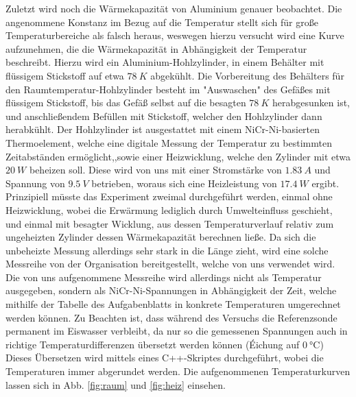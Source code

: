 \documentclass{include/protokollclass}
\begin{document}
Zuletzt wird noch die Wärmekapazität von Aluminium genauer beobachtet. Die angenommene Konstanz im Bezug auf die Temperatur stellt sich für große Temperaturbereiche als falsch heraus, weswegen hierzu versucht wird eine Kurve aufzunehmen, die die Wärmekapazität in Abhängigkeit der Temperatur beschreibt. Hierzu wird ein Aluminium-Hohlzylinder, in einem Behälter mit flüssigem Stickstoff auf etwa $\SI{78}{K}$ abgekühlt. Die Vorbereitung des Behälters für den Raumtemperatur-Hohlzylinder besteht im "Auswaschen" des Gefäßes mit flüssigem Stickstoff, bis das Gefäß selbst auf die besagten $\SI{78}{K}$ herabgesunken ist, und anschließendem Befüllen mit Stickstoff, welcher den Hohlzylinder dann herabkühlt. Der Hohlzylinder ist ausgestattet mit einem NiCr-Ni-basierten Thermoelement, welche eine digitale Messung der Temperatur zu bestimmten Zeitabständen ermöglicht,,sowie einer Heizwicklung, welche den Zylinder mit etwa $\SI{20}{W}$ beheizen soll. Diese wird von uns mit einer Stromstärke von $\SI{1.83}{A}$ und Spannung von $\SI{9.5}{V}$ betrieben, woraus sich eine Heizleistung von $\SI{17.4}{W}$ ergibt. Prinzipiell müsste das Experiment zweimal durchgeführt werden, einmal ohne Heizwicklung, wobei die Erwärmung lediglich durch Umwelteinfluss geschieht, und einmal mit besagter Wicklung, aus dessen Temperaturverlauf relativ zum ungeheizten Zylinder dessen Wärmekapazität berechnen ließe. Da sich die unbeheizte Messung allerdings sehr stark in die Länge zieht, wird eine solche Messreihe von der Organisation bereitgestellt, welche von uns verwendet wird. Die von uns aufgenommene Messreihe wird allerdings nicht als Temperatur ausgegeben, sondern als NiCr-Ni-Spannungen in Abhängigkeit der Zeit, welche mithilfe der Tabelle des Aufgabenblatts in konkrete Temperaturen umgerechnet werden können. Zu Beachten ist, dass während des Versuchs die Referenzsonde permanent im Eiswasser verbleibt, da nur so die gemessenen Spannungen auch in richtige Temperaturdifferenzen übersetzt werden können (Éichung auf $\SI{0}{\celsius}$) Dieses Übersetzen wird mittels eines C++-Skriptes durchgeführt, wobei die Temperaturen immer abgerundet werden. Die aufgenommenen Temperaturkurven lassen sich in Abb. \ref{fig:raum} und \ref{fig:heiz} einsehen.
\end{document}
